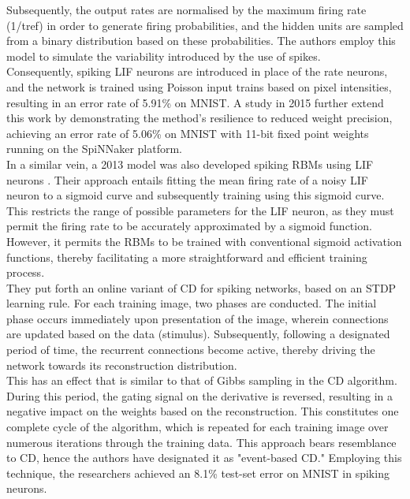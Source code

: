 \noindent Subsequently, the output rates are normalised by the maximum firing rate (1/tref) in order to generate firing probabilities, and the hidden units are sampled from a binary distribution based on these probabilities. The authors employ this model to simulate the variability introduced by the use of spikes. \\

\noindent Consequently, spiking LIF neurons are introduced in place of the rate neurons, and the network is trained using Poisson input trains based on pixel intensities, resulting in an error rate of 5.91\% on MNIST. A study in 2015 \cite{stromatias2015robustness} further extend this work by demonstrating the method's resilience to reduced weight precision, achieving an error rate of 5.06\% on MNIST with 11-bit fixed point weights running on the SpiNNaker platform. \\

\noindent In a similar vein, a 2013 model was also developed spiking RBMs using LIF neurons \cite{neftci2014event}. Their approach entails fitting the mean firing rate of a noisy LIF neuron to a sigmoid curve and subsequently training using this sigmoid curve. This restricts the range of possible parameters for the LIF neuron, as they must permit the firing rate to be accurately approximated by a sigmoid function. However, it permits the RBMs to be trained with conventional sigmoid activation functions, thereby facilitating a more straightforward and efficient training process. \\

\noindent They put forth an online variant of CD for spiking networks, based on an STDP learning rule. For each training image, two phases are conducted. The initial phase occurs immediately upon presentation of the image, wherein connections are updated based on the data (stimulus). Subsequently, following a designated period of time, the recurrent connections become active, thereby driving the network towards its reconstruction distribution. \\

\noindent This has an effect that is similar to that of Gibbs sampling in the CD algorithm. During this period, the gating signal on the derivative is reversed, resulting in a negative impact on the weights based on the reconstruction. This constitutes one complete cycle of the algorithm, which is repeated for each training image over numerous iterations through the training data. This approach bears resemblance to CD, hence the authors have designated it as "event-based CD." Employing this technique, the researchers achieved an 8.1\% test-set error on MNIST in spiking neurons. 

